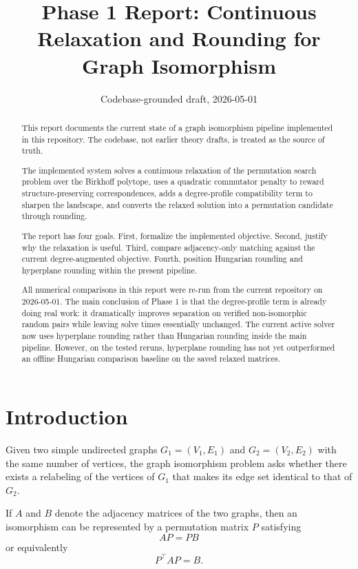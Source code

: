 \documentclass[11pt]{article}
\title{\textbf{Phase 1 Report: Continuous Relaxation and Rounding for Graph Isomorphism}}
\author{}
\date{Codebase-grounded draft, 2026-05-01}
\begin{document}
\maketitle

\begin{abstract}
This report documents the current state of a graph isomorphism pipeline implemented in this repository.
The codebase, not earlier theory drafts, is treated as the source of truth.

The implemented system solves a continuous relaxation of the permutation search problem over the Birkhoff polytope,
uses a quadratic commutator penalty to reward structure-preserving correspondences,
adds a degree-profile compatibility term to sharpen the landscape,
and converts the relaxed solution into a permutation candidate through rounding.

The report has four goals.
First, formalize the implemented objective.
Second, justify why the relaxation is useful.
Third, compare adjacency-only matching against the current degree-augmented objective.
Fourth, position Hungarian rounding and hyperplane rounding within the present pipeline.

All numerical comparisons in this report were re-run from the current repository on 2026-05-01.
The main conclusion of Phase 1 is that the degree-profile term is already doing real work:
it dramatically improves separation on verified non-isomorphic random pairs while leaving solve times essentially unchanged.
The current active solver now uses hyperplane rounding rather than Hungarian rounding inside the main pipeline.
However, on the tested reruns, hyperplane rounding has not yet outperformed an offline Hungarian comparison baseline on the saved relaxed matrices.
\end{abstract}

\tableofcontents
\newpage

\section{Introduction}

Given two simple undirected graphs $G_1 = (V_1, E_1)$ and $G_2 = (V_2, E_2)$ with the same number of vertices,
the graph isomorphism problem asks whether there exists a relabeling of the vertices of $G_1$ that makes its edge set identical to that of $G_2$.

If $A$ and $B$ denote the adjacency matrices of the two graphs,
then an isomorphism can be represented by a permutation matrix $P$ satisfying
\begin{equation}
AP = PB
\end{equation}
or equivalently
\begin{equation}
P^\top A P = B.
\end{equation}
\end{document}
